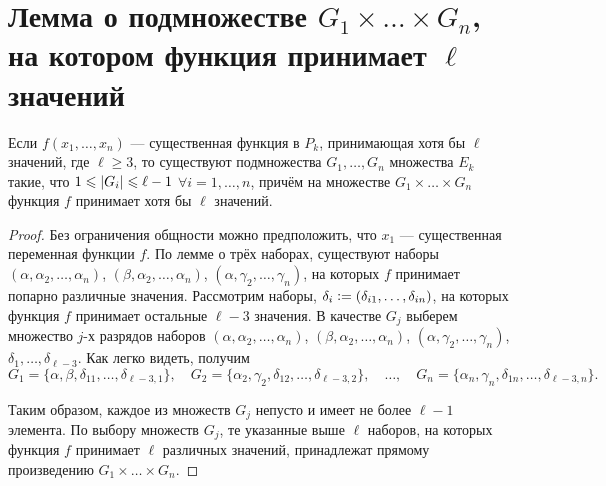 \section{Лемма о подмножестве $G_1 \times \ldots \times G_n$, на котором функция принимает $\ell$ значений}

\begin{lemma}
    Если $f(x_1, \ldots, x_n)$ --- существенная функция в $P_k$, принимающая хотя бы $\ell$ значений, где $\ell \geqslant 3$, то существуют подмножества $G_1, \ldots, G_n$ множества $E_k$ такие, что $1 \leqslant \left\lvert G_i\right\rvert \leqslant \ell - 1$ $\forall i = 1, \ldots, n$, причём на множестве $G_1 \times \ldots \times G_n$ функция $f$ принимает хотя бы $\ell$ значений.
\end{lemma}

\begin{proof}
    Без ограничения общности можно предположить, что $x_1$ --- существенная переменная функции $f$. По лемме о трёх наборах, существуют наборы $(\alpha, \alpha_2, \ldots, \alpha_n)$, $(\beta, \alpha_2, \ldots, \alpha_n)$, $(\alpha, \gamma_2, \ldots, \gamma_n)$, на которых $f$ принимает попарно различные значения. Рассмотрим наборы, $\delta_i \vcentcolon = (\delta_{i1}, \ldots, \delta_{in})$, на которых функция $f$ принимает остальные $\ell - 3$ значения. В качестве $G_j$ выберем множество $j$-х разрядов наборов $(\alpha, \alpha_2, \ldots, \alpha_n)$, $(\beta, \alpha_2, \ldots, \alpha_n)$, $(\alpha, \gamma_2, \ldots, \gamma_n)$, $\delta_1, \ldots, \delta_{\ell - 3}$. Как легко видеть, получим
    \[
        G_1 = \{\alpha, \beta, \delta_{11}, \ldots, \delta_{\ell - 3, 1}\},\quad G_2 = \{\alpha_2, \gamma_2, \delta_{12}, \ldots, \delta_{\ell - 3, 2}\},\quad \ldots,\quad G_n = \{\alpha_n, \gamma_n, \delta_{1n}, \ldots, \delta_{\ell - 3, n}\}.
    \]

    Таким образом, каждое из множеств $G_j$ непусто и имеет не более $\ell - 1$ элемента. По выбору множеств $G_j$, те указанные выше $\ell$ наборов, на которых функция $f$ принимает $\ell$ различных значений, принадлежат прямому произведению $G_1 \times \ldots \times G_n$.
\end{proof}

